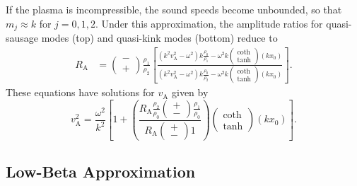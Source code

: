 If the plasma is incompressible, the sound speeds become unbounded, so that $m_j \approx k$ for $j = 0, 1, 2$. Under this approximation, the amplitude ratios for quasi-sausage modes (top) and quasi-kink modes (bottom) reduce to
\begin{align}
R_\textrm{A} &= \left(\substack{- \\ +}\right) \frac{\rho_1}{\rho_2} \left[ \frac{(k^2v_\textrm{A}^2 - \omega^2)k\frac{\rho_0}{\rho_1} - \omega^2k \left(\begin{matrix} \coth \\ \tanh \end{matrix}\right)(kx_0)}{(k^2v_\textrm{A}^2-\omega^2)k\frac{\rho_0}{\rho_2}-\omega^2k \left(\begin{matrix} \coth \\ \tanh \end{matrix}\right)(kx_0)} \right].
\end{align}
These equations have solutions for $v_\textrm{A}$ given by
\begin{equation}
v_\textrm{A}^2 = \frac{\omega^2}{k^2} \left[ 1 + \left( \frac{R_\textrm{A} \frac{\rho_2}{\rho_0} \left(\substack{+ \\ -}\right) \frac{\rho_1}{\rho_0}}{R_\textrm{A} \left(\substack{+ \\ -}\right) 1} \right) \left(\begin{matrix} \coth \\ \tanh \end{matrix}\right) (kx_0)\right].
\end{equation}


\subsection{Low-Beta Approximation} \label{sec: AR low-beta}

